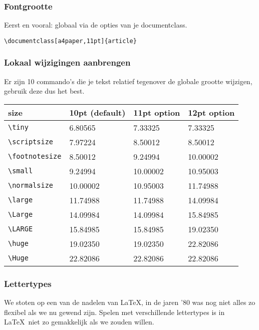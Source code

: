 \begin{frame}[fragile]
  \frametitle{Fontgrootte}

  Eerst en vooral: globaal via de opties van je documentclass.
\begin{verbatim}
\documentclass[a4paper,11pt]{article}
\end{verbatim}
\end{frame}

\begin{frame}[fragile]
  \frametitle{Lokaal wijzigingen aanbrengen}

  Er zijn 10 commando's die je tekst relatief tegenover de globale grootte wijzigen, gebruik deze dus het best.
\end{frame}

\begin{frame}[fragile]
  \begin{tabular}{llll}
    \toprule
    size & 10pt (default) & 11pt option & 12pt option \\\midrule
    \texttt{\textcolor{uagreen}{\textbackslash tiny}}         &	6.80565  &	7.33325  & 7.33325  \\
    \texttt{\textcolor{uagreen}{\textbackslash scriptsize }}  & 7.97224  &	8.50012  & 8.50012  \\
    \texttt{\textcolor{uagreen}{\textbackslash footnotesize}} & 8.50012  &	9.24994  & 10.00002 \\
    \texttt{\textcolor{uagreen}{\textbackslash small}}        & 9.24994  &	10.00002 & 10.95003 \\
    \texttt{\textcolor{uagreen}{\textbackslash normalsize}}   & 10.00002 &	10.95003 & 11.74988 \\
    \texttt{\textcolor{uagreen}{\textbackslash large}}        & 11.74988 &	11.74988 & 14.09984 \\
    \texttt{\textcolor{uagreen}{\textbackslash Large}}        & 14.09984 &	14.09984 & 15.84985 \\
    \texttt{\textcolor{uagreen}{\textbackslash LARGE}}        & 15.84985 &	15.84985 & 19.02350 \\
    \texttt{\textcolor{uagreen}{\textbackslash huge}}         & 19.02350 &	19.02350 & 22.82086 \\
    \texttt{\textcolor{uagreen}{\textbackslash Huge}}         & 22.82086 &	22.82086 & 22.82086 \\
    \bottomrule
  \end{tabular}
\end{frame}

\begin{frame}
  \frametitle{Lettertypes}

  We stoten op een van de nadelen van \LaTeX, in de jaren '80 was nog niet alles zo flexibel als we nu gewend zijn. Spelen met verschillende lettertypes is in \LaTeX~niet zo gemakkelijk als we zouden willen.
\end{frame}

